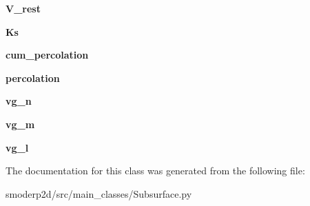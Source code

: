 \begin{DoxyCompactItemize}
\item 
\hypertarget{classsmoderp2d_1_1src_1_1main__classes_1_1Subsurface_1_1SubArrs_a691bef39cf51da5efdb94fea1f2272a1}{{\bfseries V\-\_\-rest}}\label{classsmoderp2d_1_1src_1_1main__classes_1_1Subsurface_1_1SubArrs_a691bef39cf51da5efdb94fea1f2272a1}

\item 
\hypertarget{classsmoderp2d_1_1src_1_1main__classes_1_1Subsurface_1_1SubArrs_a28d30e4ccd34097521288936adc91529}{{\bfseries Ks}}\label{classsmoderp2d_1_1src_1_1main__classes_1_1Subsurface_1_1SubArrs_a28d30e4ccd34097521288936adc91529}

\item 
\hypertarget{classsmoderp2d_1_1src_1_1main__classes_1_1Subsurface_1_1SubArrs_a87b6c5d67b9fac775260fd7a844fc9b3}{{\bfseries cum\-\_\-percolation}}\label{classsmoderp2d_1_1src_1_1main__classes_1_1Subsurface_1_1SubArrs_a87b6c5d67b9fac775260fd7a844fc9b3}

\item 
\hypertarget{classsmoderp2d_1_1src_1_1main__classes_1_1Subsurface_1_1SubArrs_a65c22873728ec0970ca12b93693eaa03}{{\bfseries percolation}}\label{classsmoderp2d_1_1src_1_1main__classes_1_1Subsurface_1_1SubArrs_a65c22873728ec0970ca12b93693eaa03}

\item 
\hypertarget{classsmoderp2d_1_1src_1_1main__classes_1_1Subsurface_1_1SubArrs_a20b6c1f5d889d73c51edb0478822eeca}{{\bfseries vg\-\_\-n}}\label{classsmoderp2d_1_1src_1_1main__classes_1_1Subsurface_1_1SubArrs_a20b6c1f5d889d73c51edb0478822eeca}

\item 
\hypertarget{classsmoderp2d_1_1src_1_1main__classes_1_1Subsurface_1_1SubArrs_afa2076afdd18d58dc43a0172345d2c15}{{\bfseries vg\-\_\-m}}\label{classsmoderp2d_1_1src_1_1main__classes_1_1Subsurface_1_1SubArrs_afa2076afdd18d58dc43a0172345d2c15}

\item 
\hypertarget{classsmoderp2d_1_1src_1_1main__classes_1_1Subsurface_1_1SubArrs_adb7cbc36ecc6a600feaad990a1769645}{{\bfseries vg\-\_\-l}}\label{classsmoderp2d_1_1src_1_1main__classes_1_1Subsurface_1_1SubArrs_adb7cbc36ecc6a600feaad990a1769645}

\end{DoxyCompactItemize}


The documentation for this class was generated from the following file\-:\begin{DoxyCompactItemize}
\item 
smoderp2d/src/main\-\_\-classes/Subsurface.\-py\end{DoxyCompactItemize}
